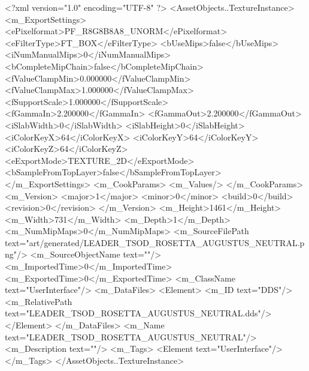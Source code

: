 <?xml version="1.0" encoding="UTF-8" ?>
<AssetObjects..TextureInstance>
	<m_ExportSettings>
		<ePixelformat>PF_R8G8B8A8_UNORM</ePixelformat>
		<eFilterType>FT_BOX</eFilterType>
		<bUseMips>false</bUseMips>
		<iNumManualMips>0</iNumManualMips>
		<bCompleteMipChain>false</bCompleteMipChain>
		<fValueClampMin>0.000000</fValueClampMin>
		<fValueClampMax>1.000000</fValueClampMax>
		<fSupportScale>1.000000</fSupportScale>
		<fGammaIn>2.200000</fGammaIn>
		<fGammaOut>2.200000</fGammaOut>
		<iSlabWidth>0</iSlabWidth>
		<iSlabHeight>0</iSlabHeight>
		<iColorKeyX>64</iColorKeyX>
		<iColorKeyY>64</iColorKeyY>
		<iColorKeyZ>64</iColorKeyZ>
		<eExportMode>TEXTURE_2D</eExportMode>
		<bSampleFromTopLayer>false</bSampleFromTopLayer>
	</m_ExportSettings>
	<m_CookParams>
		<m_Values/>
	</m_CookParams>
	<m_Version>
		<major>1</major>
		<minor>0</minor>
		<build>0</build>
		<revision>0</revision>
	</m_Version>
	<m_Height>1461</m_Height>
	<m_Width>731</m_Width>
	<m_Depth>1</m_Depth>
	<m_NumMipMaps>0</m_NumMipMaps>
	<m_SourceFilePath text="art/generated/LEADER_TSOD_ROSETTA_AUGUSTUS_NEUTRAL.png"/>
	<m_SourceObjectName text=""/>
	<m_ImportedTime>0</m_ImportedTime>
	<m_ExportedTime>0</m_ExportedTime>
	<m_ClassName text="UserInterface"/>
	<m_DataFiles>
		<Element>
			<m_ID text="DDS"/>
			<m_RelativePath text="LEADER_TSOD_ROSETTA_AUGUSTUS_NEUTRAL.dds"/>
		</Element>
	</m_DataFiles>
	<m_Name text="LEADER_TSOD_ROSETTA_AUGUSTUS_NEUTRAL"/>
	<m_Description text=""/>
	<m_Tags>
		<Element text="UserInterface"/>
	</m_Tags>
</AssetObjects..TextureInstance>
